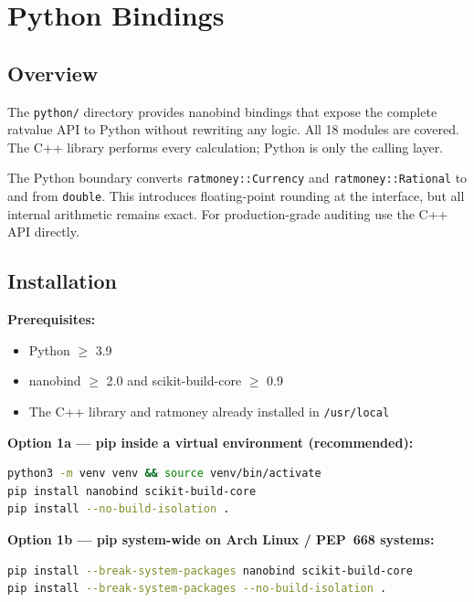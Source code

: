\documentclass[12pt, a4paper, oneside]{book}
\begin{document}
\chapter{Python Bindings}

\section{Overview}

The \texttt{python/} directory provides nanobind bindings that expose the
complete ratvalue API to Python without rewriting any logic. All 18 modules
are covered. The C++ library performs every calculation; Python is only the
calling layer.

\begin{warning}
The Python boundary converts \texttt{ratmoney::Currency} and
\texttt{ratmoney::Rational} to and from \texttt{double}. This introduces
floating-point rounding at the interface, but all internal arithmetic
remains exact. For production-grade auditing use the C++ API directly.
\end{warning}

\section{Installation}

\textbf{Prerequisites:}
\begin{itemize}
  \item Python $\geq$ 3.9
  \item nanobind $\geq$ 2.0 and scikit-build-core $\geq$ 0.9
  \item The C++ library and ratmoney already installed in \texttt{/usr/local}
\end{itemize}

\textbf{Option 1a --- pip inside a virtual environment (recommended):}
\begin{lstlisting}[style=cpp, language=bash, numbers=none]
python3 -m venv venv && source venv/bin/activate
pip install nanobind scikit-build-core
pip install --no-build-isolation .
\end{lstlisting}

\textbf{Option 1b --- pip system-wide on Arch Linux / PEP~668 systems:}
\begin{lstlisting}[style=cpp, language=bash, numbers=none]
pip install --break-system-packages nanobind scikit-build-core
pip install --break-system-packages --no-build-isolation .
\end{lstlisting}
\end{document}
